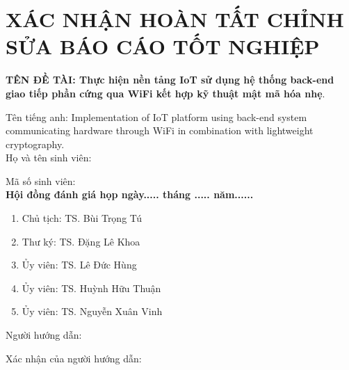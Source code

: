 \chapter*{XÁC NHẬN HOÀN TẤT CHỈNH SỬA BÁO CÁO TỐT NGHIỆP}

{\textbf{TÊN ĐỀ TÀI: Thực hiện nền tảng IoT sử dụng hệ thống back-end giao tiếp phần cứng qua WiFi kết hợp kỹ thuật mật mã hóa nhẹ}.}

{\small Tên tiếng anh: Implementation of IoT platform using back-end system communicating hardware through WiFi in combination with lightweight cryptography.}\\[.1 cm]

Họ và tên sinh viên: \tenSV

Mã số sinh viên: \mssv \\[.1 cm]

\textbf{Hội đồng đánh giá họp ngày..... tháng ..... năm......}

\begin{enumerate}
	\item Chủ tịch: TS. Bùi Trọng Tú
	\item Thư ký: TS. Đặng Lê Khoa
	\item Ủy viên: TS. Lê Đức Hùng
	\item Ủy viên: TS. Huỳnh Hữu Thuận
	\item Ủy viên: TS. Nguyễn Xuân Vinh
\end{enumerate}

\vspace{.2 cm}
Người hướng dẫn: \tenGVHD

Xác nhận của người hướng dẫn: